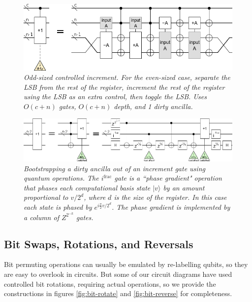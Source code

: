 \documentclass[twocolumn]{article}
\begin{document}
\begin{figure}
  \centering
  \includegraphics[width=\linewidth]{assets/controlled-increment-odd.png}
  \caption{\em
    Odd-sized controlled increment.
    For the even-sized case, separate the LSB from the rest of the register, increment the rest of the register using the LSB as an extra control, then toggle the LSB.
    Uses $O(c+n)$ gates, $O(c+n)$ depth, and 1 dirty ancilla.
  }
  \label{fig:controlled-increment-odd}
\end{figure}

\begin{figure}
  \centering
  \includegraphics[width=\linewidth]{assets/ancilla-bootstrap.png}
  \caption{\em Bootstrapping a dirty ancilla out of an increment gate using quantum operations.
  The $i^{\text{frac}}$ gate is a ``phase gradient" operation that phases each computational basis state $|v\rangle$ by an amount proportional to $v/2^d$, where $d$ is the size of the register.
  In this case each state is phased by $e^{i \frac{\pi}{2} v/2^d}$.
  The phase gradient is implemented by a column of $Z^{2^{-k}}$ gates.}
  \label{fig:bootstrap-ancilla}
\end{figure}


\subsection{Bit Swaps, Rotations, and Reversals}

Bit permuting operations can usually be emulated by re-labelling qubits, so they are easy to overlook in circuits.
But some of our circuit diagrams have used controlled bit rotations, requiring actual operations, so we provide the constructions in figures \ref{fig:bit-rotate} and \ref{fig:bit-reverse} for completeness.
\end{document}
